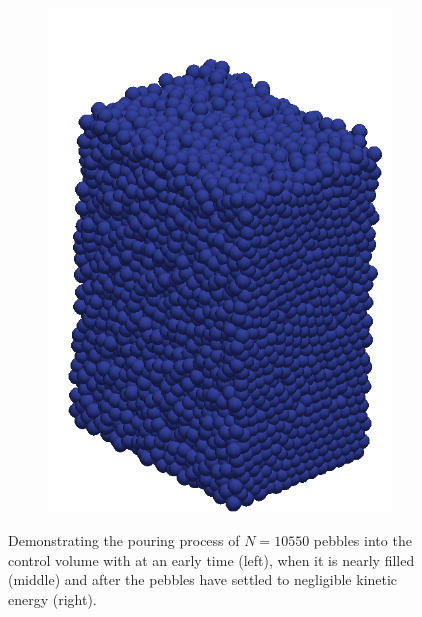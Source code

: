 \begin{figure}[h]
\begin{subfigure}[b]{0.25\textwidth}
		\includegraphics[width=\textwidth]{chapters/figures/fill03.png}
	\end{subfigure}
	\caption{Demonstrating the pouring process of $N = 10550$ pebbles into the control volume with at an early time (left), when it is nearly filled (middle) and after the pebbles have settled to negligible kinetic energy (right).}
\label{fig:fill01}
\end{figure}

